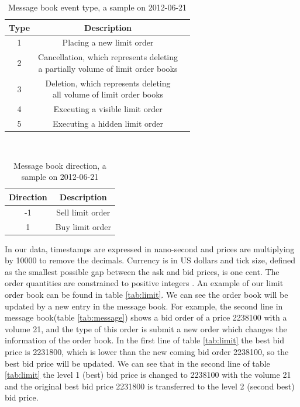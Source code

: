  \begin{table}\renewcommand{\arraystretch}{1.2} 
 	\caption{Message book event type,   a sample on 2012-06-21}
 	\label{tab:type}
 	\begin{center} 
 		\begin{tabular}{|c|c|m{5cm}}  
 			\hline
 			Type & Description\\
 			\hline
 			1 & Placing a new limit order\\
 			
 			2 & \tabincell{c}{Cancellation, which represents deleting \\a partially volume of limit order books}\\
 			
 			3& \tabincell{c}{Deletion, which represents deleting \\all volume of limit order books}\\
 			
 			4 & Executing a visible limit order \\
 			
 			5 & Executing a hidden limit order\\
 			\hline 
 		\end{tabular}\\[3ex]
 	\end{center}
 \end{table}
  
   \begin{table}
   	\caption{Message book direction,   a sample on 2012-06-21}
   	\label{tab:direction}
   	\begin{center} 
   		\begin{tabular}{|c|c|}
   			\hline
   			Direction& Description\\
   			\hline
   			-1 & Sell limit order\\
   			1 & Buy limit order\\
   		
   			\hline 
   		\end{tabular}
   	\end{center}
   \end{table}
   
In our data,   timestamps are expressed in nano-second and prices are multiplying by 10000 to remove the decimals. Currency is in US dollars and tick size,   defined as the smallest possible gap between the ask and bid prices,   is one cent. The order quantities are constrained to positive integers . An example of our limit order book can be found in table \ref{tab:limit}. We can see the order book will be updated by a new entry in the message book. For example,   the second line in message book(table \ref{tab:message}) shows a bid order of a price 2238100 with a volume 21,   and the type of this order is submit a new order which changes the information of the order book. In the first line of table \ref{tab:limit} the best bid price is 2231800,   which is lower than the new coming bid order 2238100,   so the best bid price will be updated. We can see that in the second line of table \ref{tab:limit} the level 1 (best) bid price is changed to 2238100 with the volume 21 and the original best bid price 2231800 is transferred to the level 2 (second best) bid price.

